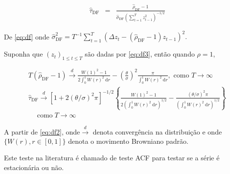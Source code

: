\begin{eqnarray}
	\hat{\tau}_{\mathrm{DF}}&=&\frac{\hat{\rho}_{\mathrm{DF}}-1}{\hat{\sigma}_{\mathrm{DF}}\left(\sum_{t=1}^T z_{t-1}^2\right)^{-1 / 2}} \label{eq:df}
\end{eqnarray}

De \eqref{eq:df} onde $\hat{\sigma}_{\mathrm{DF}}^2=T^{-1} \sum_{t=1}^T\left(\Delta z_t-\left(\hat{\rho}_{\mathrm{DF}}-1\right) z_{t-1}\right)^2 .$



Suponha que $\left(z_t\right)_{1 \leq t \leq T}$ são dadas por \eqref{eq:df3}, então quando $\rho=1$,


\begin{eqnarray}
	T\left(\hat{\rho}_{\mathrm{DF}}-1\right) \stackrel{d}{\longrightarrow} \frac{W(1)^2-1}{2 \int_0^1 W(r)^2 \mathrm{~d} r}-\left(\frac{\theta}{\sigma}\right)^2 \frac{\pi}{\int_0^1 W(r)^2 \mathrm{~d} r}, \text { como } T \rightarrow \infty \\
	\hat{\tau}_{\mathrm{DF}} \stackrel{d}{\longrightarrow}\left[1+2(\theta / \sigma)^2 \pi\right]^{-1 / 2}\left\{\frac{W(1)^2-1}{2\left(\int_0^1 W(r)^2 \mathrm{~d} r\right)^{1 / 2}}-\frac{(\theta / \sigma)^2 \pi}{\left(\int_0^1 W(r)^2 \mathrm{~d} r\right)^{1 / 2}}\right\} \\
	\quad \operatorname{como} T \rightarrow \infty\label{eq:df2}
\end{eqnarray}

A partir de \eqref{eq:df2}, onde$\stackrel{d}{\longrightarrow}$ denota convergência na distribuição e onde $\{W(r), r \in[0,1]\}$ denota o movimento Browniano padrão.

Este teste na literatura é chamado de teste ACF para testar se a série é estacionária ou não.

